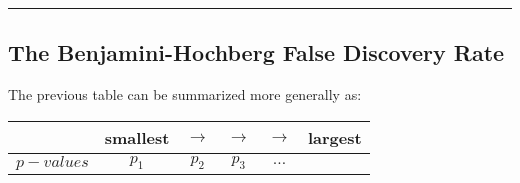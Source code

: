 \documentclass[]{article}
\begin{document}
\begin{center}\rule{0.5\linewidth}{\linethickness}\end{center}

\hypertarget{the-benjamini-hochberg-false-discovery-rate}{%
\subsection{The Benjamini-Hochberg False Discovery
Rate}\label{the-benjamini-hochberg-false-discovery-rate}}

The previous table can be summarized more generally as:

\begin{longtable}[]{@{}cccccc@{}}
\toprule
\begin{minipage}[b]{0.10\columnwidth}\centering
\strut
\end{minipage} & \begin{minipage}[b]{0.13\columnwidth}\centering
smallest\strut
\end{minipage} & \begin{minipage}[b]{0.10\columnwidth}\centering
\(\rightarrow\)\strut
\end{minipage} & \begin{minipage}[b]{0.10\columnwidth}\centering
\(\rightarrow\)\strut
\end{minipage} & \begin{minipage}[b]{0.25\columnwidth}\centering
\(\rightarrow\)\strut
\end{minipage} & \begin{minipage}[b]{0.15\columnwidth}\centering
largest\strut
\end{minipage}\tabularnewline
\midrule
\endhead
\begin{minipage}[t]{0.10\columnwidth}\centering
\(p-values\)\strut
\end{minipage} & \begin{minipage}[t]{0.13\columnwidth}\centering
\(p_1\)\strut
\end{minipage} & \begin{minipage}[t]{0.10\columnwidth}\centering
\(p_2\)\strut
\end{minipage} & \begin{minipage}[t]{0.10\columnwidth}\centering
\(p_3\)\strut
\end{minipage} & \begin{minipage}[t]{0.25\columnwidth}\centering
\(\dotsc\)\strut
\end{minipage} & \begin{minipage}[t]{0.15\columnwidth}\centering

\end{minipage}
\end{longtable}
\end{document}

